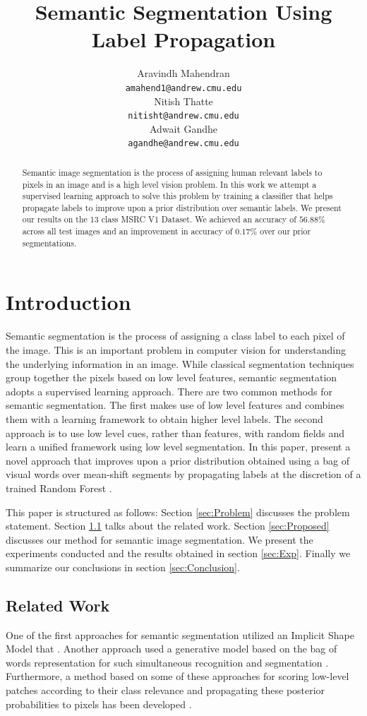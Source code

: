 \documentclass{article} %
\title{Semantic Segmentation Using Label Propagation}
\author{
Aravindh Mahendran \\
\texttt{amahend1@andrew.cmu.edu} \\ 
\And
Nitish Thatte \\
\texttt{nitisht@andrew.cmu.edu} \\
\AND
Adwait Gandhe \\
\texttt{agandhe@andrew.cmu.edu} \\
}
\begin{document}
\maketitle

\begin{abstract}
Semantic image segmentation is the process of assigning human relevant labels to pixels in an image and is a high level vision problem. In this work we attempt a supervised learning approach to solve this problem by training a classifier that helps propagate labels to improve upon a prior distribution over semantic labels. We present our results on the 13 class MSRC V1 Dataset. We achieved an accuracy of $56.88\%$ across all test images and an improvement in accuracy of $0.17\%$ over our prior segmentations.
\end{abstract}

\section{Introduction}
Semantic segmentation is the process of assigning a class label to each pixel of the image. This is an important problem in computer vision for understanding the underlying information in an image. While classical segmentation techniques group together the pixels based on low level features, semantic segmentation adopts a supervised learning approach. There are two common methods for semantic segmentation. The first makes use of low level features and combines them with a learning framework to obtain higher level labels. The second approach is to use low level cues, rather than features, with random fields and learn a unified framework using low level segmentation. In this paper, present a novel approach that improves upon a prior distribution obtained using a bag of visual words over mean-shift segments by propagating labels at the discretion of a trained Random Forest \cite{Statistics01randomforests}.

This paper is structured as follows: Section \ref{sec:Problem} discusses the problem statement. Section \ref{sec:Related} talks about the related work. Section \ref{sec:Proposed} discusses our method for semantic image segmentation. We present the experiments conducted and the results obtained in section \ref{sec:Exp}. Finally we summarize our conclusions in section \ref{sec:Conclusion}.
\label{sec:Intro}

\subsection{Related Work}
\label{sec:Related}
One of the first approaches for semantic segmentation utilized an Implicit Shape Model that %
\cite{Leibe04combinedobject}. 
Another approach used a generative model based on the bag of words representation for such simultaneous recognition and segmentation \cite{cao:spatially}.  
Furthermore, a method based on some of these approaches for scoring low-level patches according to their class relevance and propagating these posterior probabilities to pixels has been developed \cite{conf/bmvc/CsurkaP08}.
\end{document}
